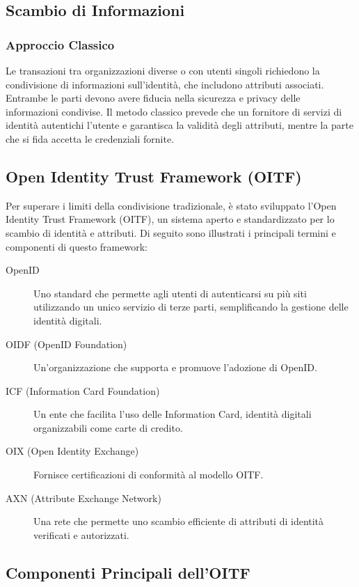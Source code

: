\subsection{Scambio di Informazioni}

\subsubsection{Approccio Classico}

Le transazioni tra organizzazioni diverse o con utenti singoli richiedono la condivisione di informazioni sull'identità, che includono attributi associati. Entrambe le parti devono avere fiducia nella sicurezza e privacy delle informazioni condivise. Il metodo classico prevede che un fornitore di servizi di identità autentichi l'utente e garantisca la validità degli attributi, mentre la parte che si fida accetta le credenziali fornite.

\subsection{Open Identity Trust Framework (OITF)}

Per superare i limiti della condivisione tradizionale, è stato sviluppato l'Open Identity Trust Framework (OITF), un sistema aperto e standardizzato per lo scambio di identità e attributi. Di seguito sono illustrati i principali termini e componenti di questo framework:

\begin{description}
    \item[OpenID] Uno standard che permette agli utenti di autenticarsi su più siti utilizzando un unico servizio di terze parti, semplificando la gestione delle identità digitali.
    \item[OIDF (OpenID Foundation)] Un'organizzazione che supporta e promuove l'adozione di OpenID.
    \item[ICF (Information Card Foundation)] Un ente che facilita l'uso delle Information Card, identità digitali organizzabili come carte di credito.
    \item[OIX (Open Identity Exchange)] Fornisce certificazioni di conformità al modello OITF.
    \item[AXN (Attribute Exchange Network)] Una rete che permette uno scambio efficiente di attributi di identità verificati e autorizzati.
\end{description}

\subsection{Componenti Principali dell'OITF}

